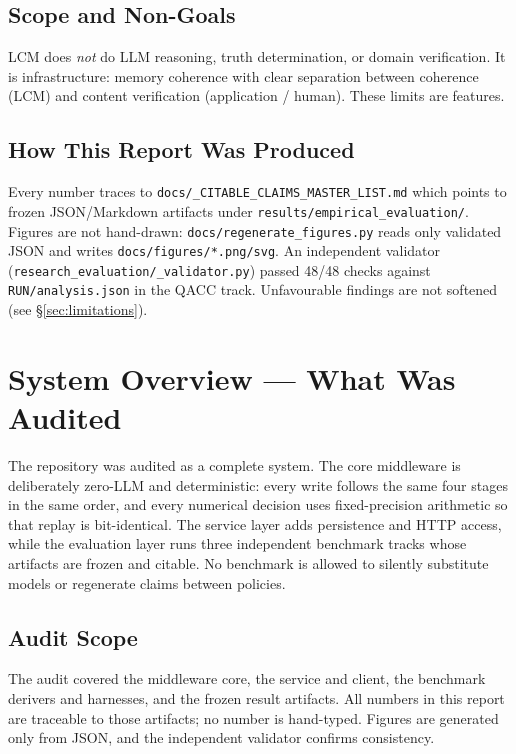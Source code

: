 \documentclass[12pt,a4paper]{article}
\begin{document}
\subsection{Scope and Non-Goals}
LCM does \emph{not} do LLM reasoning, truth determination, or domain verification. It is infrastructure: memory coherence with clear separation between coherence (LCM) and content verification (application / human). These limits are features.

\subsection{How This Report Was Produced}
Every number traces to \texttt{docs/\_CITABLE\_CLAIMS\_MASTER\_LIST.md} which points to frozen JSON/Markdown artifacts under \texttt{results/empirical\_evaluation/}. Figures are not hand-drawn: \texttt{docs/regenerate\_figures.py} reads only validated JSON and writes \texttt{docs/figures/*.png/svg}. An independent validator (\texttt{research\_evaluation/\_validator.py}) passed 48/48 checks against \texttt{RUN/analysis.json} in the QACC track. Unfavourable findings are not softened (see \S\ref{sec:limitations}).

\section{System Overview --- What Was Audited}

The repository was audited as a complete system. The core middleware is deliberately zero-LLM and deterministic: every write follows the same four stages in the same order, and every numerical decision uses fixed-precision arithmetic so that replay is bit-identical. The service layer adds persistence and HTTP access, while the evaluation layer runs three independent benchmark tracks whose artifacts are frozen and citable. No benchmark is allowed to silently substitute models or regenerate claims between policies.

\subsection{Audit Scope}
The audit covered the middleware core, the service and client, the benchmark derivers and harnesses, and the frozen result artifacts. All numbers in this report are traceable to those artifacts; no number is hand-typed. Figures are generated only from JSON, and the independent validator confirms consistency.
\end{document}
